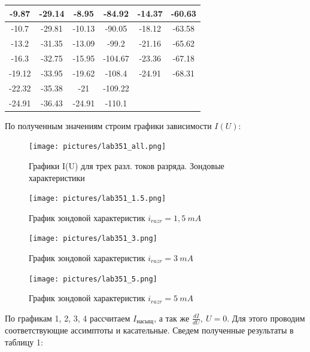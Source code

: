 \documentclass[a4paper, 14pt]{extarticle}%
\begin{document}
\begin{table}[!]
\begin{center}
\begin{tabular}{| c | c | c | c | c | c |}
        \hline
        -9.87 & -29.14 & -8.95 & -84.92 & -14.37 & -60.63\\
        \hline
        -10.7 & -29.81 & -10.13 & -90.05 & -18.12 & -63.58\\
        \hline
        -13.2 & -31.35 & -13.09 & -99.2 & -21.16 & -65.62\\
        \hline
        -16.3 & -32.75 & -15.95 & -104.67 & -23.36 & -67.18\\
        \hline
        -19.12 & -33.95 & -19.62 & -108.4 & -24.91 & -68.31\\
        \hline
        -22.32 & -35.38 & -21 & -109.22 &  & \\
        \hline
        -24.91 & -36.43 & -24.91 & -110.1 &  & \\
        \hline
  	\end{tabular}
  \end{center}
\label{A_table}
\end{table}

По полученным значениям строим графики зависимости $I(U)$:

\begin{figure}[h!]
	\centering
	\texttt{[image: pictures/lab351\_all.png]}
	\caption{Графики I(U) для трех разл. токов разряда. Зондовые характеристики}
	\label{C}
\end{figure}

\begin{figure}[h!]
	\centering
	\texttt{[image: pictures/lab351\_1.5.png]}
	\caption{График зондовой характеристик $i_{razr} = 1,5 \: mA$}
	\label{C}
\end{figure}


\begin{figure}[h!]
	\centering
	\texttt{[image: pictures/lab351\_3.png]}
	\caption{График зондовой характеристик $i_{razr} = 3 \: mA$}
	\label{C}
\end{figure}

\begin{figure}[h!]
	\centering
	\texttt{[image: pictures/lab351\_5.png]}
	\caption{График зондовой характеристик $i_{razr} = 5 \: mA$}
	\label{C}
\end{figure}


\newpage


По графикам 1, 2, 3, 4 рассчитаем $I_{насыщ}$, а так же $\frac{dI}{dU}, \: U = 0$.
Для этого проводим соответствующие ассимптоты и касательные. Сведем полученные результаты в таблицу 1:
\end{document}

